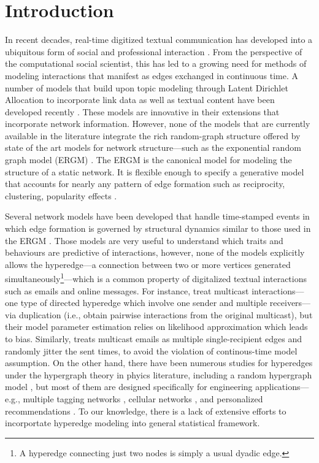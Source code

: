 \documentclass[ba]{imsart}
\numberwithin{equation}{section}
\theoremstyle{plain}
\begin{document}
\section{Introduction}\label{sec:introduction}

In recent decades, real-time digitized textual communication has developed into a ubiquitous form of social and professional interaction \citep{kanungo2008modeling, szostek2011dealing, burgess2004email, pew2016}. From the perspective of the computational social scientist, this has led to a growing need for methods of modeling interactions that manifest as edges exchanged in continuous time. A number of models that build upon topic modeling through Latent Dirichlet Allocation \citep{Blei2003} to incorporate link data as well as textual content have been developed recently \citep{mccallum2005author,lim2013twitter,Krafft2012}. These models are innovative in their extensions that incorporate network information. However, none of the models that are currently available in the literature integrate the rich random-graph structure offered by state of the art models for network structure---such as the exponential random graph model (ERGM) \citep{robins2007introduction,chatterjee2013estimating,hunter2008ergm}. The ERGM is the canonical model for modeling the structure of a static network. It is flexible enough to specify a generative model that accounts for nearly any pattern of edge formation such as reciprocity, clustering, popularity effects \citep{desmarais2017statistical}. 

Several network models have been developed that handle time-stamped events in which edge formation is governed by structural dynamics similar to those used in the ERGM \citep{Butts2008,Vu2011,snijders1996stochastic}. Those models are very useful to understand which traits and behaviours are predictive of interactions, however, none of the models explicitly allows the hyperedge---a connection between two or more vertices generated simultaneously\footnote{A hyperedge connecting just two nodes is simply a usual dyadic edge.}---which is a common property of digitalized textual interactions such as emails and online messages. For instance, \cite{PerryWolfe2012} treat multicast interactions---one type of directed hyperedge which involve one sender and multiple receivers---via duplication (i.e., obtain pairwise interactions from the original multicast), but their model parameter estimation relies on likelihood approximation which leads to bias. Similarly, \cite{fan2009learning} treats multicast emails as multiple single-recipient edges and randomly jitter the sent times, to avoid the violation of continous-time model assumption. On the other hand, there have been numerous studies for hyperedges under the hypergraph theory \citep{karypis1999multilevel} in phyics literature, including a random hypergraph model \citep{ghoshal2009random}, but most of them are designed specifically for engineering applications---e.g., multiple tagging networks \citep{zlatic2009hypergraph,zhang2010hypergraph}, cellular networks \citep{klamt2009hypergraphs}, and personalized recommendations \citep{zhang2010personalized,blattner2009b}. To our knowledge, there is a lack of extensive efforts to incorportate hyperedge modeling into general statistical framework.
\end{document}
